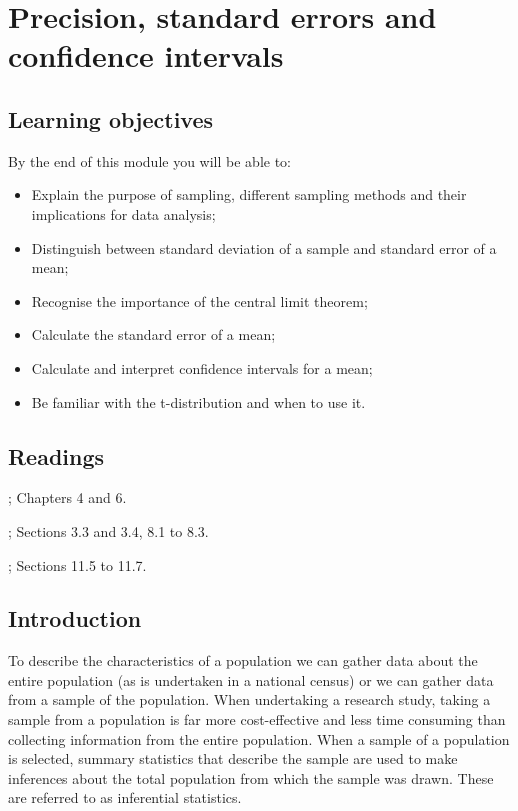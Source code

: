 \documentclass[
]{memoir}
\providecommand{\tightlist}{%
  \setlength{\itemsep}{0pt}\setlength{\parskip}{0pt}}
\begin{document}
\hypertarget{precision-standard-errors-and-confidence-intervals}{%
\chapter{Precision, standard errors and confidence intervals}\label{precision-standard-errors-and-confidence-intervals}}

\hypertarget{learning-objectives-2}{%
\section*{Learning objectives}\label{learning-objectives-2}}

By the end of this module you will be able to:

\begin{itemize}
\tightlist
\item
  Explain the purpose of sampling, different sampling methods and their implications for data analysis;
\item
  Distinguish between standard deviation of a sample and standard error of a mean;
\item
  Recognise the importance of the central limit theorem;
\item
  Calculate the standard error of a mean;
\item
  Calculate and interpret confidence intervals for a mean;
\item
  Be familiar with the t-distribution and when to use it.
\end{itemize}

\hypertarget{readings-2}{%
\section*{Readings}\label{readings-2}}

\citet{kirkwood_sterne01}; Chapters 4 and 6.

\citet{bland15}; Sections 3.3 and 3.4, 8.1 to 8.3.

\citet{juul_frydenberg14}; Sections 11.5 to 11.7.

\hypertarget{introduction-2}{%
\section{Introduction}\label{introduction-2}}

To describe the characteristics of a population we can gather data about the entire population (as is undertaken in a national census) or we can gather data from a sample of the population. When undertaking a research study, taking a sample from a population is far more cost-effective and less time consuming than collecting information from the entire population. When a sample of a population is selected, summary statistics that describe the sample are used to make inferences about the total population from which the sample was drawn. These are referred to as inferential statistics.
\end{document}
